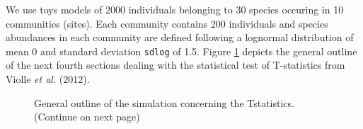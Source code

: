 \documentclass[12pt]{article}\usepackage[]{graphicx}\usepackage[]{color}
\begin{document}
We use toys models of 2000 individuals belonging to 30 species occuring in 10 communities (sites). Each community contains 200 individuals and species abundances in each community are defined following a lognormal distribution of mean 0 and standard deviation \texttt{sdlog} of 1.5.
Figure \ref{fig:General_outline} depicts the general outline of the next fourth sections dealing with the statistical test of T-statistics from Violle \textit{et al.} (2012).

\begin{figure}[ht]
\centering
\hspace*{-0.8cm}
\vspace*{-0.5cm}
\caption[General outline of the simulation concerning the Tstatistics]{General outline of the simulation concerning the Tstatistics. (Continue on next page) }
\label{fig:General_outline}
\end{figure}
\end{document}

